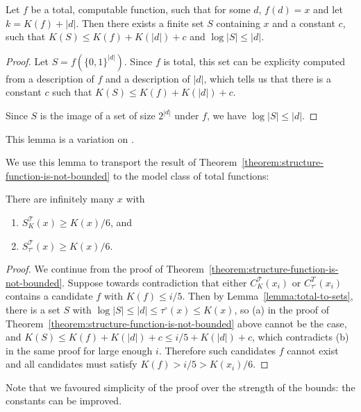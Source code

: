 \documentclass{style/llncs}
\newcommand{\T}{\mathcal T}
\begin{document}
% 

\begin{lemma}
Let $f$ be a total, computable function, such that for some $d$, $f(d) = x$ and let $k = K(f) + |d|$. Then there exists a finite set $S$ containing $x$ and a constant $c$, such that $K(S) \leq K(f) + K(|d|) + c$ and $\log |S| \leq |d|$.\label{lemma:total-to-sets}
\end{lemma}
\begin{proof}
Let $S = f\left(\{0,1\}^{|d|}\right)$. Since $f$ is total, this set can be explicity computed from a description of $f$ and a description of $|d|$, which tells us that there is a constant $c$ such that $K(S) \leq K(f) + K(|d|) + c$. 

Since $S$ is the image of a set of size $2^{|d|}$ under $f$, we have $\log |S| \leq |d|$.
\end{proof}
This lemma is a variation on \cite[Lemma~7.2]{vitanyi2004meaningful}.

We use this lemma to transport the result of Theorem~\ref{theorem:structure-function-is-not-bounded} to the model class of total functions:

\begin{theorem}
There are infinitely many $x$ with 
\begin{enumerate}
  \item $S^\T_K(x) \geq K(x)/6$, {and}\label{eq:poezenvoer}
  \item $S^\T_{\tau^\circ}(x) \geq K(x)/6$. \label{eq:hondevoer}
\end{enumerate}
\end{theorem}
\begin{proof}
We continue from the proof of Theorem~\ref{theorem:structure-function-is-not-bounded}. Suppose towards contradiction that either $C^\T_K(x_i)$ or $C^T_{\tau^\circ}(x_i)$ contains a candidate $f$ with $K(f)\le i/5$. Then by Lemma~\ref{lemma:total-to-sets}, there is a set $S$ with $\log|S|\le|d|\le\tau^\circ(x)\le K(x)$, so (a) in the proof of Theorem~\ref{theorem:structure-function-is-not-bounded} above cannot be the case, and $K(S)\le K(f)+K(|d|)+c\le i/5+K(|d|)+c$, which contradicts (b) in the same proof for large enough $i$. Therefore such candidates $f$ cannot exist and all candidates must satisfy $K(f)>i/5>K(x_i)/6$.
\end{proof}

Note that we favoured simplicity of the proof over the strength of the bounds: the constants can be improved.
\end{document}
